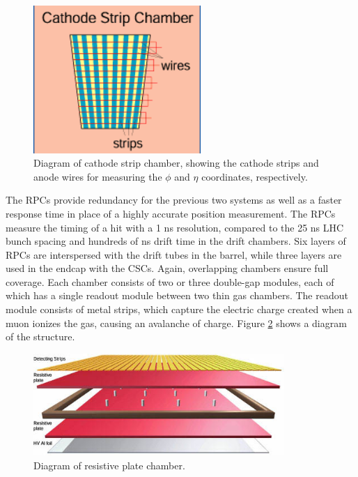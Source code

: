  \begin{figure}[htb]
  \begin{center}
    \includegraphics[width=180pt]{Figures/muon-CSC-structure.png}
  \end{center}
  \caption[\fixspacing Diagram of cathode strip chamber]
	  {\fixspacing Diagram of cathode strip chamber, 
	    showing the cathode strips and anode wires 
	    for measuring the $\phi$ and $\eta$ coordinates, respectively.}
  \label{fig:CSCstructure}
 \end{figure}

The RPCs provide redundancy for the previous 
two systems as well as a faster response time 
in place of a highly accurate position measurement.  
The RPCs measure the timing of a hit with a 
1 ns resolution, compared to the 25 ns LHC bunch spacing 
and hundreds of ns drift time in the drift chambers.  
Six layers of RPCs are interspersed with the 
drift tubes in the barrel, 
while three layers are used in the endcap 
with the CSCs.  
Again, overlapping chambers ensure full coverage.  
Each chamber consists of two or three double-gap 
modules, each of which has a single readout module 
between two thin gas chambers.  
The readout module consists of metal strips, 
which capture the electric charge created when 
a muon ionizes the gas, causing an avalanche of charge.  
Figure \ref{fig:RPClayers} shows a diagram of the structure.  

 \begin{figure}[htb]
  \begin{center}
    \includegraphics[width=270pt]{Figures/muon-RPClayers.jpg}
  \end{center}
  \caption[\fixspacing Diagram of resistive plate chamber]
	  {\fixspacing Diagram of resistive plate chamber.}
  \label{fig:RPClayers}
 \end{figure}

